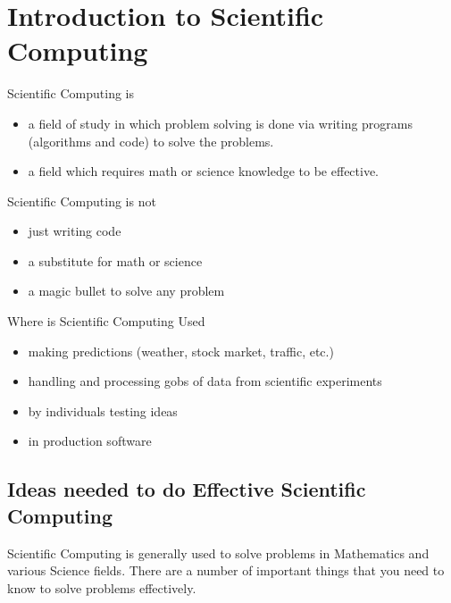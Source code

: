 
\hypertarget{ch:intro}{%
\chapter{Introduction to Scientific Computing}
\label{ch:intro}}

Scientific Computing is

\begin{itemize}

\item  a field of study in which problem solving is done via writing programs
  (algorithms and code) to solve the problems.
\item  a field which requires math or science knowledge to be effective.
\end{itemize}

Scientific Computing is not

\begin{itemize}
\item  just writing code
\item  a substitute for math or science
\item  a magic bullet to solve any problem
\end{itemize}

Where is Scientific Computing Used

\begin{itemize}

\item
  making predictions (weather, stock market, traffic, etc.)
\item
  handling and processing gobs of data from scientific experiments
\item
  by individuals testing ideas
\item
  in production software
\end{itemize}

\hypertarget{ideas-needed-to-do-effective-scientific-computing}{%
\section{Ideas needed to do Effective Scientific
Computing}\label{ideas-needed-to-do-effective-scientific-computing}}

Scientific Computing is generally used to solve problems in Mathematics
and various Science fields. There are a number of important things that
you need to know to solve problems effectively.

